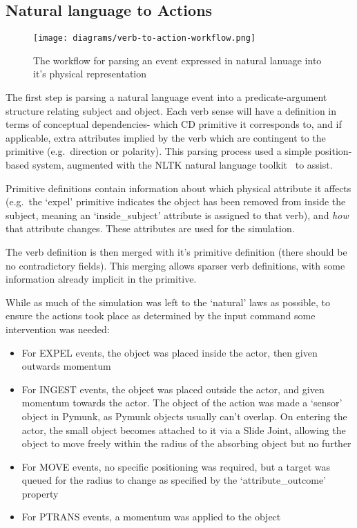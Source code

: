 \documentclass[dissertation.tex]{subfiles}
\begin{document}
    \subsection{Natural language to Actions}

    \begin{figure}[h]
        \begin{center}
            \texttt{[image: diagrams/verb-to-action-workflow.png]}
        \end{center}
        \caption{The workflow for parsing an event expressed in natural lanuage into it's physical representation}
    \end{figure}

    The first step is parsing a natural language event into a predicate-argument structure relating subject and object. Each verb sense will have a definition in terms of conceptual dependencies- which CD primitive it corresponds to, and if applicable, extra attributes implied by the verb which are contingent to the primitive (e.g.~direction or polarity). This parsing process used a simple position-based system, augmented with the NLTK natural language toolkit~\cite{bird2009nltk} to assist.
    
    Primitive definitions contain information about which physical attribute it affects (e.g.~the `expel' primitive indicates the object has been removed from inside the subject, meaning an `inside\_subject' attribute is assigned to that verb), and \emph{how} that attribute changes. These attributes are used for the simulation.
    
    The verb definition is then merged with it's primitive definition (there should be no contradictory fields). This merging allows sparser verb definitions, with some information already implicit in the primitive.

    While as much of the simulation was left to the `natural' laws as possible, to ensure the actions took place as determined by the input command some intervention was needed:

    \begin{itemize}
        \item For EXPEL events, the object was placed inside the actor, then given outwards momentum
        \item For INGEST events, the object was placed outside the actor, and given momentum towards the actor. The object of the action was made a `sensor' object in Pymunk, as Pymunk objects usually can't overlap. On entering the actor, the small object becomes attached to it via a Slide Joint, allowing the object to move freely within the radius of the absorbing object but no further
        \item For MOVE events, no specific positioning was required, but a target was queued for the radius to change as specified by the `attribute\_outcome' property
        \item For PTRANS events, a momentum was applied to the object
    \end{itemize}
\end{document}
